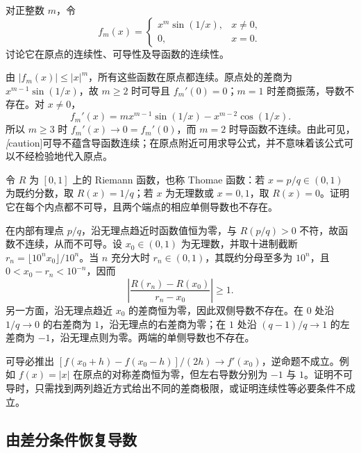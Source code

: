 \begin{example}
\label{ex:pei-diff-oscillation-derivative}
对正整数 $m$，令
\[
 f_m(x)=\begin{cases}x^m\sin(1/x),&x\ne0,\\0,&x=0.\end{cases}
\]
讨论它在原点的连续性、可导性及导函数的连续性。
\end{example}
\begin{solve}
由 $|f_m(x)|\le |x|^m$，所有这些函数在原点都连续。原点处的差商为 $x^{m-1}\sin(1/x)$，故 $m\ge2$ 时可导且 $f_m'(0)=0$；$m=1$ 时差商振荡，导数不存在。对 $x\ne0$，
\[
 f_m'(x)=mx^{m-1}\sin(1/x)-x^{m-2}\cos(1/x).
\]
所以 $m\ge3$ 时 $f_m'(x)\to0=f_m'(0)$，而 $m=2$ 时导函数不连续。由此可见，\emph[caution]{可导不蕴含导函数连续}；在原点附近可用求导公式，并不意味着该公式可以不经检验地代入原点。
\end{solve}


\begin{example}
\label{ex:pei-diff-riemann-nondifferentiable}
令 $R$ 为 $[0,1]$ 上的 Riemann 函数，也称 Thomae 函数：若 $x=p/q\in(0,1)$ 为既约分数，取 $R(x)=1/q$；若 $x$ 为无理数或 $x=0,1$，取 $R(x)=0$。证明它在每个内点都不可导，且两个端点的相应单侧导数也不存在。
\end{example}
\begin{solve}
在内部有理点 $p/q$，沿无理点趋近时函数值恒为零，与 $R(p/q)>0$ 不符，故函数不连续，从而不可导。设 $x_0\in(0,1)$ 为无理数，并取十进制截断 $r_n=\lfloor10^n x_0\rfloor/10^n$。当 $n$ 充分大时 $r_n\in(0,1)$，其既约分母至多为 $10^n$，且 $0<x_0-r_n<10^{-n}$，因而
\[
 \left|\frac{R(r_n)-R(x_0)}{r_n-x_0}\right|\ge1.
\]
另一方面，沿无理点趋近 $x_0$ 的差商恒为零，因此双侧导数不存在。在 $0$ 处沿 $1/q\to0$ 的右差商为 $1$，沿无理点的右差商为零；在 $1$ 处沿 $(q-1)/q\to1$ 的左差商为 $-1$，沿无理点则为零。两端的单侧导数也不存在。
\end{solve}

\begin{notealert}[type=caution,title={对称差商不能替代导数}]
可导必推出 $[f(x_0+h)-f(x_0-h)]/(2h)\to f'(x_0)$，逆命题不成立。例如 $f(x)=|x|$ 在原点的对称差商恒为零，但左右导数分别为 $-1$ 与 $1$。证明不可导时，只需找到两列趋近方式给出不同的差商极限，或证明连续性等必要条件不成立。
\end{notealert}

\subsection{由差分条件恢复导数}

